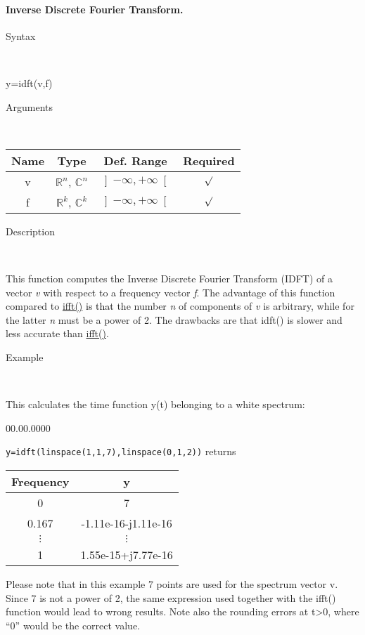 \paragraph{\label{par:Inverse-Discrete-Fourier}Inverse Discrete Fourier Transform.}

\begin{description}
\item [Syntax]~
\end{description}
y=idft(v,f)

\begin{description}
\item [Arguments]~
\end{description}
\begin{tabular}{|c|c|c|c|}
\hline 
Name&
Type&
Def. Range&
Required\tabularnewline
\hline
\hline 
v&
$\mathbb{R}^{n}$, $\mathbb{C}^{n}$&
$\left]-\infty,+\infty\right[$&
$\surd$\tabularnewline
\hline 
f&
$\mathbb{R}^{k}$, $\mathbb{C}^{k}$&
$\left]-\infty,+\infty\right[$&
$\surd$\tabularnewline
\hline
\end{tabular}

\begin{description}
\item [Description]~
\end{description}
This function computes the Inverse Discrete Fourier Transform (IDFT)
of a vector \textit{v} with respect to a frequency vector \textit{f}.
The advantage of this function compared to \textcolor{blue}{\hyperlink{ifft}{ifft()}}
\textcolor{black}{is that} the number \textit{n} of components of
\textit{v} is arbitrary, while for the latter \textit{n} must be a
power of 2. The drawbacks are that idft() is slower and less accurate
than \textcolor{blue}{\hyperlink{ifft}{ifft()}}.

\begin{description}
\item [Example]~
\end{description}
This calculates the time function y(t) belonging to a white spectrum:

\begin{lyxlist}{00.00.0000}
\item [\texttt{y=idft(linspace(1,1,7),linspace(0,1,2))}]returns \begin{tabular}{|c|c|}
\hline 
Frequency&
y\tabularnewline
\hline
\hline 
0&
7\tabularnewline
\hline 
0.167&
-1.11e-16-j1.11e-16\tabularnewline
\hline 
$\vdots$&
$\vdots$\tabularnewline
\hline 
1&
1.55e-15+j7.77e-16\tabularnewline
\hline
\end{tabular}
\end{lyxlist}
Please note that in this example 7 points are used for the spectrum
vector v. Since 7 is not a power of 2, the same expression used together
with the ifft() function would lead to wrong results. Note also the
rounding errors at t>0, where {}``0'' would be the correct value.

